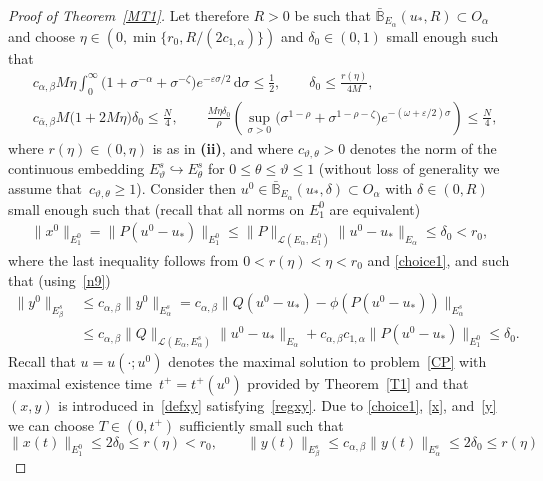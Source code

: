 \documentclass[reqno,11pt]{amsart}
\numberwithin{equation}{section}
\newcommand{\ve}{\varepsilon}
\newcommand{\rd}{\mathrm{d}}
\theoremstyle{remark}
\begin{document}
\begin{proof}[Proof of Theorem~\ref{MT1}]
Let therefore $R>0$ be such that $\bar{\mathbb{B}}_{E_\alpha}(u_*,R)\subset O_\alpha$ and choose  $\eta\in (0,\min\{r_0,R/ (2 c_{1,\alpha})\})$ and $\delta_0\in (0,1)$ small enough such that 
\begin{subequations}
\label{choice}
\begin{align}
& c_{\alpha,\beta}M\eta \int_0^\infty \big(1+\sigma^{-\alpha}+\sigma^{-\zeta} \big)e^{-\ve \sigma/2} \,\rd \sigma\le \frac{1}{2},\qquad \delta_0\le \frac{r(\eta)}{4M} ,\label{choice1}\\
& c_{\bar \alpha,\beta}M\big(1+2M\eta\big)\delta_0 \le\frac{N}{4}, \qquad \frac{M \eta \delta_0}{\rho} \left(\sup_{\sigma>0} \big(\sigma^{1-\rho}+\sigma^{1-\rho-\zeta}\big)e^{-(\omega  +\ve/2) \sigma}\right)\le\frac{N}{4},\label{choice2}
\end{align}
\end{subequations}
where $r(\eta)\in (0,\eta)$ is as in {\bf (ii)}, and where $c_{\vartheta,\theta}>0$ denotes the norm of the continuous embedding $E_\vartheta^s \hookrightarrow E_\theta^s$ for $0\le \theta\le\vartheta\le 1$ (without loss of generality we assume that~${c_{\vartheta,\theta}\ge 1}$).
Consider then $u^0\in \bar{\mathbb{B}}_{E_\alpha}(u_*,\delta)\subset O_\alpha$ with $\delta\in (0,R)$ small enough such that (recall that all norms on $E_1^0$ are equivalent)
\begin{align}\label{x}
\|x^0\|_{E_1^0}=\|P(u^0-u_*)\|_{E_1^0}\le \|P\|_{\mathcal{L}(E_\alpha,E_1^0)}\|u^0-u_*\|_{E_\alpha}\le \delta_0   <r_0,
\end{align}
where the last inequality  follows from $0<r(\eta)<\eta<r_0$  and \eqref{choice1}, and such that (using~\eqref{n9})
\begin{equation}\label{y} 
\begin{split}
\|y^0\|_{E_\beta^s}&\le c_{\alpha,\beta}\|y^0\|_{E_\alpha^s}=c_{\alpha,\beta}\|Q(u^0-u_*)-\phi(P(u^0-u_*))\|_{E_\alpha^s}\\
&\le c_{\alpha,\beta}\|Q\|_{\mathcal{L}(E_\alpha,E_\alpha^s)}\|u^0-u_*\|_{E_\alpha}+c_{\alpha,\beta}c_{1,\alpha}\|P(u^0-u_*)\|_{E_1^0}
\le \delta_0.
\end{split}
\end{equation}
 Recall that $u = u(\cdot;u^0)$ denotes the maximal solution to problem~\eqref{CP}  with maximal existence time~$t^+=t^+(u^0)$ provided by Theorem~\ref{T1} and that $(x,y)$ is introduced in~\eqref{defxy} satisfying~\eqref{regxy}. Due to \eqref{choice1}, \eqref{x}, and~\eqref{y} we can choose $T\in (0,t^+)$ sufficiently small such that
$$
\|x(t)\|_{E_1^0}\le 2\delta_0\le r(\eta) <r_0 ,\qquad \|y(t)\|_{E_\beta^s}\le c_{\alpha,\beta}\|y(t)\|_{E_\alpha^s}\le 2\delta_0\le r(\eta)
$$
\end{proof}
\end{document}
